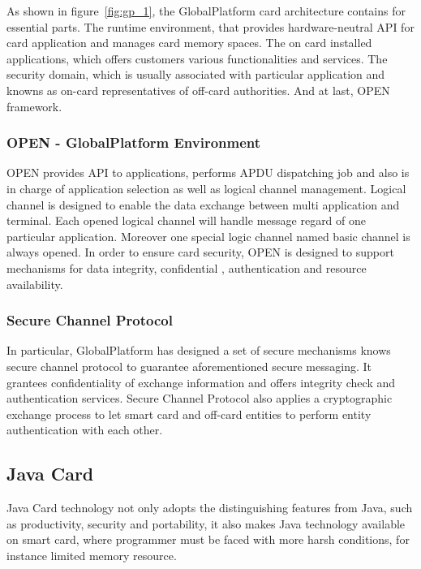 \documentclass[]{llncs}
\begin{document}
As shown in figure~\ref{fig:gp_1},  the GlobalPlatform card architecture contains for essential parts. The runtime environment, that provides hardware-neutral API for card application  and manages card memory spaces. The on card installed applications, which offers customers various functionalities and services. The security domain, which is usually associated with particular application and knowns as on-card representatives  of off-card  authorities. And at last,  OPEN framework\cite{gp}.

\subsubsection{OPEN - GlobalPlatform Environment}
OPEN provides API  to applications, performs APDU dispatching  job and also is in charge of application selection as  well as logical channel management\cite{gp}. Logical channel is designed to enable the data exchange between multi application and terminal. Each opened logical channel will handle message regard of one particular application.  Moreover one special logic channel named basic channel is always opened. In order to ensure  card security, OPEN is designed to support mechanisms for data integrity, confidential ,  authentication and resource availability.
\subsubsection{Secure Channel Protocol}
In particular, GlobalPlatform has designed a set of secure mechanisms knows secure channel  protocol to guarantee aforementioned secure messaging. It grantees confidentiality of exchange information and offers integrity check and authentication services. Secure Channel Protocol also applies a cryptographic exchange process to let smart card and  off-card entities to perform entity authentication with each other. 
\subsection{Java Card}
Java Card technology not only adopts the distinguishing features from Java, such as productivity, security and portability\cite{jcadg}, it also makes Java technology available on smart card, where programmer must be faced with more harsh conditions, for instance limited memory resource.
\end{document}
